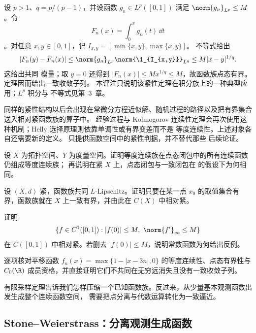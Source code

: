 \begin{remark}[积分原函数的共同模量]\label{ex:1-3-2-3}
设 $p>1$、$q=p/(p-1)$，并设函数 $g_n\in L^p([0,1])$ 满足
$\norm{g_n}_{L^p}\le M$。令
\[
  F_n(x)=\int_0^xg_n(t)\,\dd t
\]
。对任意 $x,y\in[0,1]$，记
$I_{x,y}=[\min\{x,y\},\max\{x,y\}]$。\Holder{} 不等式给出
\[
 |F_n(y)-F_n(x)|
 \le \norm{g_n}_{L^p}\norm{\1_{I_{x,y}}}_{L^q}
 \le M|x-y|^{1/q}.
\]
这给出共同 \Holder{} 模量；取 $y=0$ 还得到
$|F_n(x)|\le Mx^{1/q}\le M$，故函数族点态有界。\ArzelaAscoli{} 定理因而给出一致收敛子列。
本评注只说明该紧性定理在积分族上的一种典型应用；$L^p$ 积分与 \Holder{} 不等式见第~3~章。
\end{remark}

同样的紧性结构以后会出现在常微分方程近似解、随机过程的路径以及把有界集合送入相对紧函数族的算子中。
经验过程与 Kolmogorov 连续性定理会再次使用这种机制；Helly 选择原理则依靠单调性或有界变差而不是
等度连续性。上述对象各自还需要新的定义。\ArzelaAscoli{} 只提供函数空间中的紧性判据，并不替代那些
后续论证。

\begin{exercise}[闭包保持等度连续]
设 $X$ 为拓扑空间、$Y$ 为度量空间。证明等度连续族在点态闭包中的所有连续函数仍组成等度连续族；
再说明在紧 $X$ 上，点态闭包与一致闭包在 \ArzelaAscoli{} 的假设下为何相同。
\end{exercise}

\begin{exercise}[一点值控制]
设 $(X,d)$ 紧，函数族共同 $L$-Lipschitz。证明只要在某一点 $x_0$ 的取值集合有界，函数族就在
$X$ 上一致有界，并由此在 $C(X)$ 中相对紧。
\end{exercise}

\begin{exercise}[导数控制的函数族]
证明
\[
 \{f\in C^1([0,1]):|f(0)|\le M,\ \norm{f'}_\infty\le M\}
\]
在 $C([0,1])$ 中相对紧。若删去 $|f(0)|\le M$，说明常数函数为何给出反例。
\end{exercise}

\begin{exercise}[非紧域的缺失条件]
逐项核对平移函数 $f_n(x)=\max\{1-|x-3n|,0\}$ 的等度连续性、点态有界性与
$C_0(\R)$ 成员资格，并直接证明它们不共同在无穷远消失且没有一致收敛子列。
\end{exercise}

有限采样定理告诉我们怎样压缩一个已知函数族。反过来，从少量基本观测函数出发生成整个连续函数空间，
需要把点分离与代数运算转化为一致逼近。

\subsection{Stone--Weierstrass：分离观测生成函数}\label{subsec:1-3-3}

